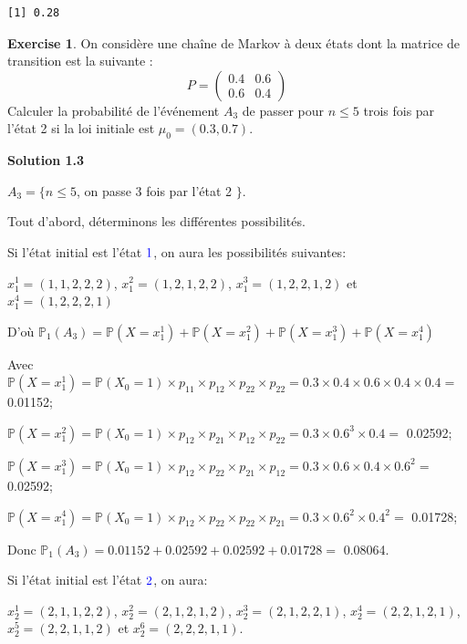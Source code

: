 \documentclass[
]{book}
\theoremstyle{definition}
\theoremstyle{definition}
\theoremstyle{definition}
\newtheorem{exercise}{Exercise}[chapter]
\theoremstyle{remark}
\begin{document}
\begin{verbatim}
[1] 0.28
\end{verbatim}

\begin{exercise}
\protect\hypertarget{exr:unnamed-chunk-42}{}{\label{exr:unnamed-chunk-42} } On considère une chaîne de Markov à deux états dont la matrice de transition est la suivante :
\[ P=\left( 
  \begin{array}{cc}
0.4 & 0.6 \\
0.6 & 0.4 
\end{array}
\right)\]
Calculer la probabilité de l'événement \(A_3\) de passer pour \(n \leq 5\) trois fois par l'état 2 si la loi initiale est \(\mu_0=(0.3,0.7)\).
\end{exercise}

\textbf{Solution 1.3}

\(A_3=\{n \leq 5\), on passe 3 fois par l'état 2 \(\}\).

Tout d'abord, déterminons les différentes possibilités.

Si l'état initial est l'état \(\color{blue}{1}\), on aura les possibilités suivantes:

\(x_1^1=(1, 1, 2, 2, 2)\), \(x_1^2=(1, 2,1, 2, 2)\), \(x_1^3=(1 ,2 ,2 ,1 , 2)\) et \(x_1^4=(1 , 2, 2, 2, 1)\)

D'où \(\mathbb{P}_1(A_3)=\mathbb{P}(X=x_1^1)+\mathbb{P}(X=x_1^2)+\mathbb{P}(X=x_1^3)+\mathbb{P}(X=x_1^4)\)

Avec \(\mathbb{P}(X=x_1^1)=\mathbb{P}(X_0=1)\times p_{11}\times p_{12}\times p_{22}\times p_{22}=0.3 \times 0.4 \times 0.6 \times 0.4 \times 0.4=\) 0.01152;

\(\mathbb{P}(X=x_1^2)=\mathbb{P}(X_0=1) \times p_{12}\times p_{21}\times p_{12}\times p_{22}=0.3\times 0.6^3 \times 0.4 =\) 0.02592;

\(\mathbb{P}(X=x_1^3)=\mathbb{P}(X_0=1)\times p_{12}\times p_{22}\times p_{21}\times p_{12}=0.3\times 0.6 \times 0.4 \times 0.6^2 =\) 0.02592;

\(\mathbb{P}(X=x_1^4)=\mathbb{P}(X_0=1)\times p_{12}\times p_{22}\times p_{22}\times p_{21}=0.3\times 0.6^2 \times 0.4^2 =\) 0.01728;

Donc \(\mathbb{P}_1(A_3)= 0.01152+0.02592+0.02592+0.01728=\) 0.08064.

Si l'état initial est l'état \(\color{blue}{2}\), on aura:

\(x_2^1=(2,1, 1, 2, 2)\), \(x_2^2=(2, 1, 2, 1,2)\), \(x_2^3=(2 , 1 , 2, 2, 1)\), \(x_2^4=(2, 2, 1, 2, 1)\), \(x_2^5=(2, 2 , 1 , 1 , 2)\) et \(x_2^6=(2, 2, 2 , 1 , 1)\).
\end{document}
